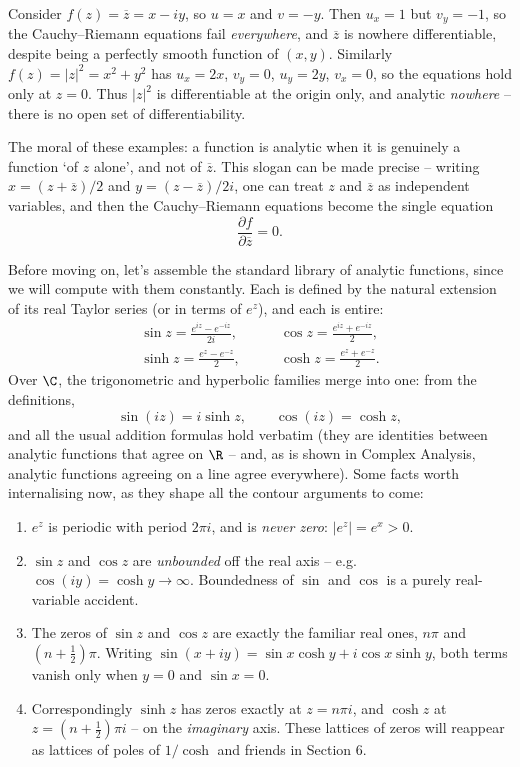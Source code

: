 \begin{example}
	Consider $f(z) = \overline{z} = x - iy$, so $u = x$ and $v = -y$. Then $u_x = 1$ but $v_y = -1$, so the Cauchy--Riemann equations fail \emph{everywhere}, and $\overline{z}$ is nowhere differentiable, despite being a perfectly smooth function of $(x,y)$. Similarly $f(z) = |z|^2 = x^2 + y^2$ has $u_x = 2x$, $v_y = 0$, $u_y = 2y$, $v_x = 0$, so the equations hold only at $z = 0$. Thus $|z|^2$ is differentiable at the origin only, and analytic \emph{nowhere} -- there is no open set of differentiability.
\end{example}

The moral of these examples: a function is analytic when it is genuinely a function `of $z$ alone', and not of $\overline{z}$. This slogan can be made precise -- writing $x = (z + \overline z)/2$ and $y = (z - \overline z)/2i$, one can treat $z$ and $\overline{z}$ as independent variables, and then the Cauchy--Riemann equations become the single equation
$$
\frac{\partial f}{\partial \overline{z}} = 0.
$$

Before moving on, let's assemble the standard library of analytic functions, since we will compute with them constantly. Each is defined by the natural extension of its real Taylor series (or in terms of $e^z$), and each is entire:
\begin{align*}
	\sin z = \frac{e^{iz} - e^{-iz}}{2i}, &\qquad \cos z = \frac{e^{iz} + e^{-iz}}{2}, \\
	\sinh z = \frac{e^{z} - e^{-z}}{2}, &\qquad \cosh z = \frac{e^{z} + e^{-z}}{2}.
\end{align*}
Over $\C$, the trigonometric and hyperbolic families merge into one: from the definitions,
$$
\sin(iz) = i \sinh z, \qquad \cos(iz) = \cosh z,
$$
and all the usual addition formulas hold verbatim (they are identities between analytic functions that agree on $\R$ -- and, as is shown in Complex Analysis, analytic functions agreeing on a line agree everywhere). Some facts worth internalising now, as they shape all the contour arguments to come:

\begin{enumerate}[label=(\roman*)]
	\item $e^z$ is periodic with period $2\pi i$, and is \emph{never zero}: $|e^z| = e^x > 0$.
	\item $\sin z$ and $\cos z$ are \emph{unbounded} off the real axis -- e.g.\ $\cos(iy) = \cosh y \to \infty$. Boundedness of $\sin$ and $\cos$ is a purely real-variable accident.
	\item The zeros of $\sin z$ and $\cos z$ are exactly the familiar real ones, $n\pi$ and $(n + \frac 12)\pi$. Writing $\sin(x + iy) = \sin x \cosh y + i \cos x \sinh y$, both terms vanish only when $y = 0$ and $\sin x = 0$.
	\item Correspondingly $\sinh z$ has zeros exactly at $z = n\pi i$, and $\cosh z$ at $z = \left(n + \frac 12\right)\pi i$ -- on the \emph{imaginary} axis. These lattices of zeros will reappear as lattices of poles of $1/\cosh$ and friends in Section 6.
\end{enumerate}

